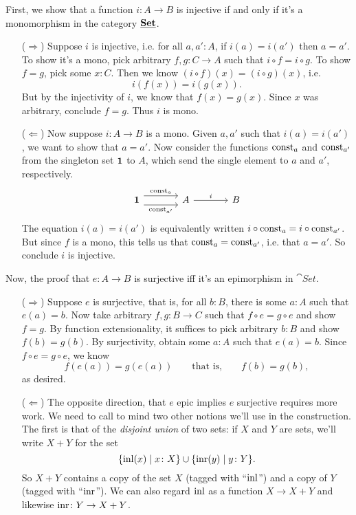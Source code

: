 \begin{Answer}
  First, we show that a function $i\colon A\to B$ is injective if and only if it's a monomorphism in the category $\cat{\Set}$.
  \begin{enumerate}
    \item[($\Rightarrow$)] Suppose $i$ is injective, i.e. for all $a,a'\colon A$, if $i(a)=i(a')$ then $a=a'$. To show it's a mono, pick arbitrary $f,g\colon C\to A$ such that $i\circ f = i\circ g$. To show $f=g$, pick some $x\colon C$. Then we know $(i\circ f)(x)=(i\circ g)(x)$, i.e.
    \[ i(f(x)) = i(g(x)). \]
    But by the injectivity of $i$, we know that $f(x)=g(x)$. Since $x$ was arbitrary, conclude $f=g$. Thus $i$ is mono.
    \item[($\Leftarrow$)] Now suppose $i\colon A\to B$ is a mono. Given $a,a'$ such that $i(a)=i(a')$, we want to show that $a=a'$. Now consider the functions $\const[a]$ and $\const[a']$ from the singleton set $\bf{1}$ to $A$, which send the single element to $a$ and $a'$, respectively.
    \[ \begin{tikzcd}[column sep=large] \bf{1} \arrow[shift left=2]{r}{\const[a]} \arrow[swap,shift right=2]{r}{\const[a']} & A \arrow{r}{i} & B \end{tikzcd} \]
    The equation $i(a)=i(a')$ is equivalently written $i\circ\const[a]=i\circ\const[a']$. But since $f$ is a mono, this tells us that $\const[a]=\const[a']$, i.e. that $a=a'$. So conclude $i$ is injective.
  \end{enumerate}

  Now, the proof that $e\colon A \to B$ is surjective iff it's an epimorphism in $\cat{Set}$.
  \begin{enumerate}
    \item[($\Rightarrow$)] Suppose $e$ is surjective, that is, for all $b\colon B$, there is some $a\colon A$ such that $e(a)=b$. Now take arbitrary $f,g\colon B\to C$ such that $f\circ e=g\circ e$ and show $f=g$. By function extensionality, it suffices to pick arbitrary $b\colon B$ and show $f(b)=g(b)$. By surjectivity, obtain some $a\colon A$ such that $e(a)=b$. Since $f\circ e=g\circ e$, we know
    \[ f(e(a)) = g(e(a)) \qquad\text{that is,}\qquad f(b)=g(b),\]
    as desired.
    \item[($\Leftarrow$)] The opposite direction, that $e$ epic implies $e$ surjective requires more work. We need to call to mind two other notions we'll use in the construction. The first is that of the \emph{disjoint union} of two sets: if $X$ and $Y$ are sets, we'll write $X+Y$ for the set
    \[  \{\inl(x) \mid x\colon X\} \cup \{\inr(y)\mid y\colon Y\}. \]
    So $X+Y$ contains a copy of the set $X$ (tagged with ``$\inl$'') and a copy of $Y$ (tagged with ``$\inr$''). We can also regard $\inl$ as a function $X\to X+Y$ and likewise $\inr\colon Y\to X+Y$.
    

\end{enumerate}
\end{Answer}
